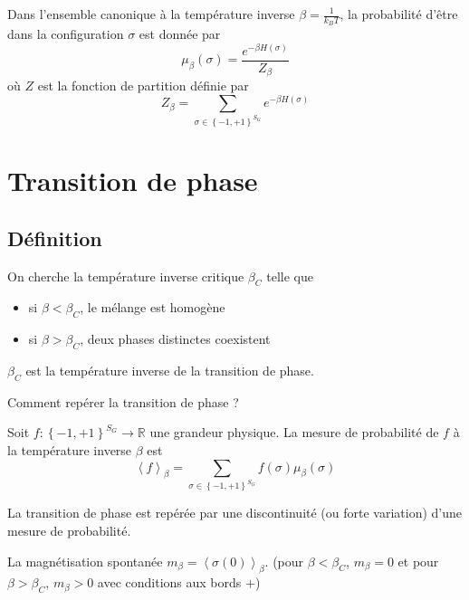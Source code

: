 \documentclass[french]{beamer}
\begin{document}
\begin{frame}
    \begin{definition}
    Dans l'ensemble canonique à la température inverse $\beta = \frac{1}{k_BT}$, la probabilité d'être dans la configuration \(\sigma\)  est donnée par
        \[\mu_\beta(\sigma) = \frac{e^ { - \beta H(\sigma)}}{Z_\beta} \]
        où $Z$ est la fonction de partition définie par \[Z_\beta = \sum_{\sigma \in \left\{-1, +1\right\}^{S_G}} e^{-\beta H(\sigma)}\]
    \end{definition}
\end{frame}

\section{Transition de phase}
\subsection{Définition}

\begin{frame}
    On cherche la température inverse critique $\beta_C$ telle que
    \begin{itemize}
        \item si $\beta < \beta_C$, le mélange est homogène
        \item si $\beta > \beta_C$, deux phases distinctes coexistent
    \end{itemize}
    $\beta_C$ est la température inverse de la transition de phase.
    
    Comment repérer la transition de phase ?
\end{frame}

\begin{frame}
\begin{definition}
    Soit $f : \left\{-1, +1\right\}^{S_G} \to \mathbb{R}$ une grandeur physique. La mesure de probabilité de $f$ à la température inverse $\beta$ est
    \[ \left\langle f \right\rangle_\beta = \sum_{\sigma \in \left\{-1, +1\right\}^{S_G}} f(\sigma)\mu_\beta(\sigma)\]
\end{definition}
La transition de phase est repérée par une discontinuité (ou forte variation) d'une mesure de probabilité.

\begin{example}
    La magnétisation spontanée $m_\beta = \left\langle \sigma(0) \right\rangle_\beta$. (pour $\beta < \beta_C$, $m_\beta = 0$ et pour $\beta > \beta_C$, $m_\beta > 0$ avec conditions aux bords $+$)
\end{example}
\end{frame}
\end{document}
